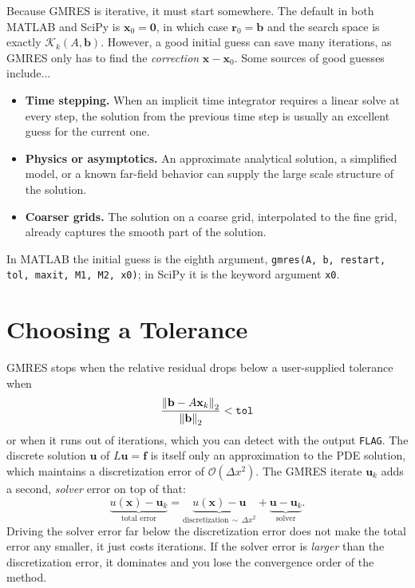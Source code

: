 Because GMRES is iterative, it must start somewhere. The default in both
MATLAB and SciPy is $\mathbf{x}_0 = \mathbf{0}$, in which case
$\mathbf{r}_0 = \mathbf{b}$ and the search space is exactly
$\mathcal{K}_k(A,\mathbf{b})$. However, a good initial guess can save many iterations, as GMRES only has to find the
\emph{correction} $\mathbf{x} - \mathbf{x}_0$. Some sources of good guesses include...
\begin{itemize}
  \item \textbf{Time stepping.} When an implicit time integrator requires a
        linear solve at every step, the solution from the previous time step
        is usually an excellent guess for the current one.
  \item \textbf{Physics or asymptotics.} An approximate analytical solution,
        a simplified model, or a known far-field behavior can supply the large
        scale structure of the solution.
  \item \textbf{Coarser grids.} The solution on a coarse grid, interpolated to
        the fine grid, already captures the smooth part of the solution.
\end{itemize}
In MATLAB the initial guess is the eighth argument,
\texttt{gmres(A, b, restart, tol, maxit, M1, M2, x0)}; in SciPy it is the
keyword argument \texttt{x0}.


\section{Choosing a Tolerance}
\label{sec:gmres-tol}

GMRES stops when the relative residual drops below a user-supplied tolerance when
\begin{equation}
  \frac{\norm{\mathbf{b} - A\mathbf{x}_k}_2}{\norm{\mathbf{b}}_2} <
  \texttt{tol}
  \label{eq:gmres-stop}
\end{equation}
or when it runs out of iterations, which you can detect with the output
\texttt{FLAG}. The discrete solution
$\mathbf{u}$ of $L\mathbf{u} = \mathbf{f}$ is itself only an approximation to
the PDE solution, which maintains a discretization error of
$\mathcal{O}(\Delta x^2)$. The GMRES iterate
$\mathbf{u}_k$ adds a second, \emph{solver} error on top of that:
\[
  \underbrace{u(\mathbf{x}) - \mathbf{u}_k}_{\text{total error}}
  = \underbrace{u(\mathbf{x}) - \mathbf{u}}_{\text{discretization}
    \,\sim\,\Delta x^2}
  + \underbrace{\mathbf{u} - \mathbf{u}_k}_{\text{solver}} .
\]
Driving the solver error far below the discretization error does not make the
total error any smaller, it just costs iterations. If the
solver error is \emph{larger} than the discretization error, it dominates and
you lose the convergence order of the method. 

